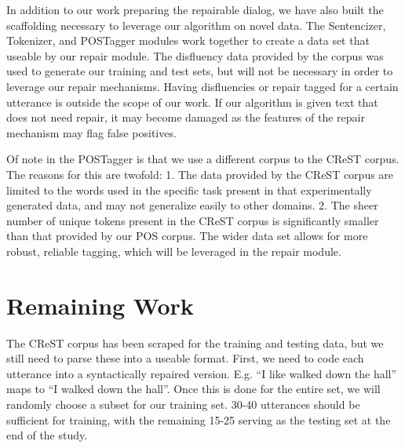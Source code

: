 \documentclass{article}
\begin{document}
\begin{flushleft}

  In addition to our work preparing the repairable dialog, we have also built the scaffolding necessary to leverage our algorithm on novel data. The Sentencizer, Tokenizer, and POSTagger modules work together to create a data set that useable by our repair module. The disfluency data provided by the corpus was used to generate our training and test sets, but will not be necessary in order to leverage our repair mechanisms. Having disfluencies or repair tagged for a certain utterance is outside the scope of our work. If our algorithm is given text that does not need repair, it may become damaged as the features of the repair mechanism may flag false positives.

\end{flushleft}

\begin{flushleft}

  Of note in the POSTagger is that we use a different corpus to the CReST corpus. The reasons for this are twofold: 1. The data provided by the CReST corpus are limited to the words used in the specific task present in that experimentally generated data, and may not generalize easily to other domains. 2. The sheer number of unique tokens present in the CReST corpus is significantly smaller than that provided by our POS corpus. The wider data set allows for more robust, reliable tagging, which will be leveraged in the repair module.

\end{flushleft}
  
\section{Remaining Work}

\begin{flushleft}

  The CReST corpus has been scraped for the training and testing data, but we still need to parse these into a useable format. First, we need to code each utterance into a syntactically repaired version. E.g. ``I like walked down the hall'' maps to ``I walked down the hall''. Once this is done for the entire set, we will randomly choose a subset for our training set. 30-40 utterances should be sufficient for training, with the remaining 15-25 serving as the testing set at the end of the study.

\end{flushleft}
\end{document}
